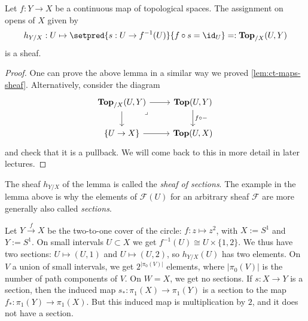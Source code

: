\begin{lem}[name=sheaf of sections]\label{exmp:sheaf-of-sections}
    Let $f: Y \to X$ be a continuous map of topological spaces. The assignment on opens of $X$ given by 
    \[
        h_{Y/X}: U \mapsto \setpred{s: U \to f^{-1}(U) }{ f \circ s = \id_U} =: \cont[X](U, Y)
    \]
    is a sheaf.
\end{lem}
\begin{proof}
    One can prove the above lemma in a similar way we proved \cref{lem:ct-maps-sheaf}. 
    Alternatively, consider the diagram 
    \[\begin{tikzcd}
	{\cont[X](U,Y)} & {\cont(U,Y)} \\
	{\{U \to X\}} & {\cont(U,X)}
	\arrow["{f \circ -}", from=1-2, to=2-2]
	\arrow[from=1-1, to=2-1]
	\arrow[from=2-1, to=2-2]
	\arrow[from=1-1, to=1-2]
	\arrow["\lrcorner"{anchor=center, pos=0.125}, draw=none, from=1-1, to=2-2]
\end{tikzcd}\]
    and check that it is a pullback. We will come back to this in more detail in later lectures. 
\end{proof}

The sheaf \(h_{Y/X}\) of the lemma is called the \emph{sheaf of sections}.
The example in the lemma above is why the elements of $\mathcal{F}(U)$ for an arbitrary sheaf \(\mathcal F\) are more generally also called \emph{sections}. 

\begin{exmp}
    Let $Y \xrightarrow{f} X$ be the two-to-one cover of the circle: $f: z \mapsto z^2$, with $X := S^1$ and $Y:= S^1$. 
    On small intervals $U \subset X$ we get $f^{-1}(U)  \cong U \times \{1,2\}$. We thus have two sections: $U \mapsto (U, 1)$ and $U \mapsto (U, 2)$, so $h_{Y/X}(U)$ has two elements.
    On $V$ a union of small intervals, we get $2^{|\pi_0(V)|}$ elements, where $|\pi_0(V)|$ is the number of path components of $V$. 
    On $W = X$, we get no sections. If $s: X \to Y$ is a section, then the induced map $s_*: \pi_1(X) \to \pi_1(Y)$ is a section to the map $f_*: \pi_1(Y) \to \pi_1(X)$. But this induced map is multiplication by $2$, and it does not have a section. 
\end{exmp}
